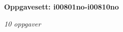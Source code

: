 \centerline{\bf Oppgavesett: i00801no-i00810no}
\vskip 10pt
\centerline{\it 10 oppgaver}\vskip 10pt
\vskip 10pt
